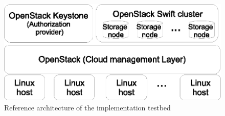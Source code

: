  \begin{figure} [t]
 	\centering
 	\includegraphics[width=.6\textwidth]{NSS16/reference-implementation-architecture}
 	\caption{Reference architecture of the implementation testbed}
 	\label{fig:reference-implementation-architecture}
 \end{figure}
